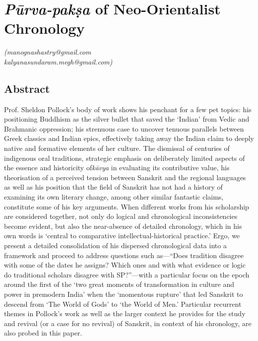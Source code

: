 
\chapter{\textit{Pūrva-pakṣa} of Neo-Orientalist Chronology}\label{chapter1}




\begin{flushright}
\textit{(manognashastry@gmail.com}\\\textit{kalyanasundaram.megh@gmail.com)}
\end{flushright}


\section*{Abstract}

Prof. Sheldon Pollock’s body of work shows his penchant for a few pet topics: his positioning Buddhism as the silver bullet that saved the ‘Indian’ from Vedic and Brahmanic oppression; his strenuous case to uncover tenuous parallels between Greek classics and Indian epics, effectively taking away the Indian claim to deeply native and formative elements of her culture. The dismissal of centuries of indigenous oral traditions, strategic emphasis on deliberately limited aspects of the essence and historicity of\textit{kāvya} in evaluating its contributive value, his theorisation of a perceived tension between Sanskrit and the regional languages as well as his position that the field of Sanskrit has not had a history of examining its own literary change, among other similar fantastic claims, constitute some of his key arguments. When different works from his scholarship are considered together, not only do logical and chronological inconsistencies become evident, but also the near-absence of detailed chronology, which in his own words is ‘central to comparative intellectual-historical practice.’ Ergo, we present a detailed consolidation of his dispersed chronological data into a framework and proceed to address questions such as—“Does tradition disagree with some of the dates he assigns? Which ones and with what evidence or logic do traditional scholars disagree with SP?”—with a particular focus on the epoch around the first of the ‘two great moments of transformation in culture and power in premodern India’ when the ‘momentous rupture’ that led Sanskrit to descend from ‘The World of Gods’ to ‘the World of Men.’ Particular recurrent themes in Pollock’s work as well as the larger context he provides for the study and revival (or a case for no revival) of Sanskrit, in context of his chronology, are also probed in this paper.


